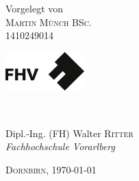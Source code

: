 \begin{titlepage}
\begin{center}

Vorgelegt von\\ [0.4cm]
\textsc{\Large Martin Münch BSc.}\\
1410249014 \\[2cm]

\begin{minipage}{0.48\textwidth}
	\begin{center} 
		\includegraphics[height=1.5cm]{./img/FHVlogo1}
	\end{center}
\end{minipage}
\hfill\\ [0.2cm]

\begin{minipage}{0.7\textwidth}
	\begin{center} \large
		Dipl.-Ing. (FH) Walter \textsc{Ritter} \\ %
		\emph{Fachhochschule Vorarlberg}
		
	\end{center}
\end{minipage}

\vspace*{\fill}
\textsc{ \large Dornbirn, \today}\\
\hfill




\vfill %

\end{center}

\end{titlepage}

